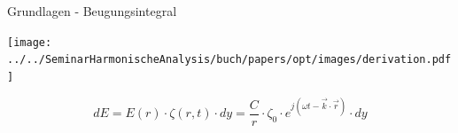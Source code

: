 \begin{frame}{Grundlagen - Beugungsintegral}
    \begin{center}
        \texttt{[image: ../../SeminarHarmonischeAnalysis/buch/papers/opt/images/derivation.pdf]}
    \end{center}
    \begin{equation}
        dE
        =
        E(r) \cdot \zeta(r, t) \cdot dy
        =
        \frac{C}{r} \cdot \zeta_0 \cdot e^{j(\omega t - \vec{k}\cdot\vec{r})} \cdot dy
    \end{equation}
\end{frame}
